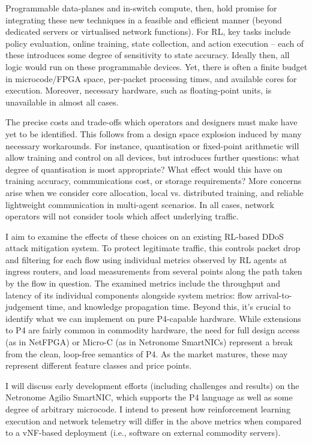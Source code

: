 \documentclass[sigconf,natbib=false]{acmart}
\begin{document}
Programmable data-planes and in-switch compute, then, hold promise for integrating these new techniques in a feasible and efficient manner (beyond dedicated servers or virtualised network functions). For RL, key tasks include policy evaluation, online training, state collection, and action execution -- each of these introduces some degree of sensitivity to state accuracy. Ideally then, all logic would run on these programmable devices. Yet, there is often a finite budget in microcode/FPGA space, per-packet processing times, and available cores for execution. Moreover, necessary hardware, such as floating-point units, is unavailable in almost all cases.

The precise costs and trade-offs which operators and designers must make have yet to be identified. This follows from a design space explosion induced by many necessary workarounds. For instance, quantisation or fixed-point arithmetic will allow training and control on all devices, but introduces further questions: what degree of quantisation is most appropriate? What effect would this have on training accuracy, communications cost, or storage requirements? More concerns arise when we consider core allocation, local vs. distributed training, and reliable lightweight communication in multi-agent scenarios. In all cases, network operators will not consider tools which affect underlying traffic.

I aim to examine the effects of these choices on an existing RL-based DDoS attack mitigation system. To protect legitimate traffic, this controls packet drop and filtering for each flow using individual metrics observed by RL agents at ingress routers, and load measurements from several points along the path taken by the flow in question. The examined metrics include the throughput and latency of its individual components alongside system metrics: flow arrival-to-judgement time, and knowledge propagation time. Beyond this, it's crucial to identify what we can implement on pure P4-capable hardware. While extensions to P4 are fairly common in commodity hardware, the need for full design access (as in NetFPGA) or Micro-C (as in Netronome SmartNICs) represent a break from the clean, loop-free semantics of P4. As the market matures, these may represent different feature classes and price points.

I will discuss early development efforts (including challenges and results) on the Netronome Agilio SmartNIC, which supports the P4 language as well as some degree of arbitrary microcode. I intend to present how reinforcement learning execution and network telemetry will differ in the above metrics when compared to a vNF-based deployment (i.e., software on external commodity servers).
\end{document}
